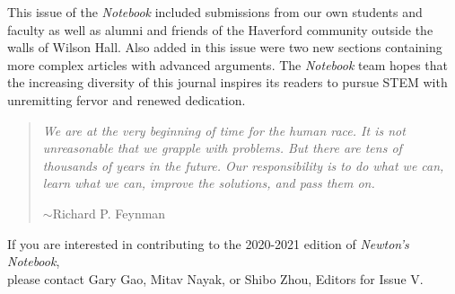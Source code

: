 \documentclass[12pt]{article}
\theoremstyle{definition}
\begin{document}
    This issue of the \textit{Notebook} included submissions from our own students and faculty as well as alumni and friends of the Haverford community outside the walls of Wilson Hall. Also added in this issue were two new sections containing more complex articles with advanced arguments. The \textit{Notebook} team hopes that the increasing diversity of this journal inspires its readers to pursue STEM with unremitting fervor and renewed dedication. 

\begin{quotation}
\textit{We are at the very beginning of time for the human race. It is not unreasonable that we grapple with problems. But there are tens of thousands of years in the future. Our responsibility is to do what we can, learn what we can, improve the solutions, and pass them on.}
	\begin{flushright}
$\sim$Richard P. Feynman
	\end{flushright}
\end{quotation}

\begin{center}
If you are interested in contributing to the 2020-2021 edition of \textit{Newton’s Notebook},\\ 
please contact Gary Gao, Mitav Nayak, or Shibo Zhou, Editors for Issue V.
\end{center}

\end{document}

